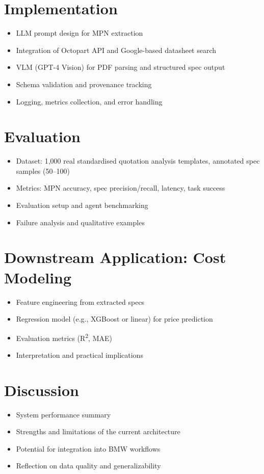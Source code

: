 \documentclass[11pt]{article}
\begin{document}
\section{Implementation}
\begin{itemize}
  \item LLM prompt design for MPN extraction
  \item Integration of Octopart API and Google-based datasheet search
  \item VLM (GPT-4 Vision) for PDF parsing and structured spec output
  \item Schema validation and provenance tracking
  \item Logging, metrics collection, and error handling
\end{itemize}

\section{Evaluation}
\begin{itemize}
  \item Dataset: 1,000 real standardised quotation analysis templates, annotated spec samples (50--100)
  \item Metrics: MPN accuracy, spec precision/recall, latency, task success
  \item Evaluation setup and agent benchmarking
  \item Failure analysis and qualitative examples
\end{itemize}

\section{Downstream Application: Cost Modeling}
\begin{itemize}
  \item Feature engineering from extracted specs
  \item Regression model (e.g., XGBoost or linear) for price prediction
  \item Evaluation metrics (R\textsuperscript{2}, MAE)
  \item Interpretation and practical implications
\end{itemize}

\section{Discussion}
\begin{itemize}
  \item System performance summary
  \item Strengths and limitations of the current architecture
  \item Potential for integration into BMW workflows
  \item Reflection on data quality and generalizability
\end{itemize}
\end{document}
